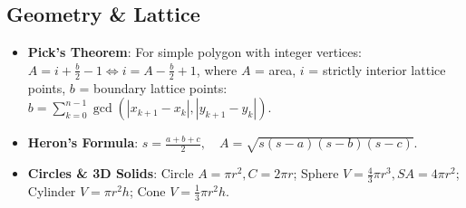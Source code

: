 \subsection*{Geometry \& Lattice}
\begin{itemize}
    \setlength\itemsep{0.3em}
    \item \textbf{Pick's Theorem}: For simple polygon with integer vertices:
    $A = i + \frac{b}{2} - 1 \iff i = A - \frac{b}{2} + 1$,
    where $A$ = area, $i$ = strictly interior lattice points, $b$ = boundary lattice points:
    $b = \sum_{k=0}^{n-1} \gcd(|x_{k+1}-x_k|, |y_{k+1}-y_k|)$.
    \item \textbf{Heron's Formula}: $s = \frac{a+b+c}{2}, \quad A = \sqrt{s(s-a)(s-b)(s-c)}$.
    \item \textbf{Circles \& 3D Solids}: Circle $A = \pi r^2, C = 2\pi r$; Sphere $V = \frac{4}{3}\pi r^3, SA = 4\pi r^2$; Cylinder $V = \pi r^2 h$; Cone $V = \frac{1}{3}\pi r^2 h$.
\end{itemize}
